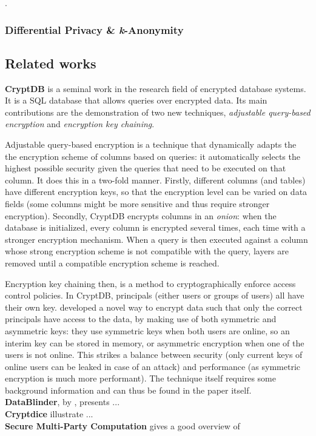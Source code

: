 .\\


\subsubsection{Differential Privacy \& \textit{k}-Anonymity}

\subsection{Related works}
\textbf{CryptDB} \citep{cryptdb} is a seminal work in the research field of encrypted database systems. It is a SQL database that allows queries over encrypted data. Its main contributions are the demonstration of two new techniques, \textit{adjustable query-based encryption} and \textit{encryption key chaining}. 

Adjustable query-based encryption is a technique that dynamically adapts the the encryption scheme of columns based on queries: it automatically selects the highest possible security given the queries that need to be executed on that column. It does this in a two-fold manner. Firstly, different columns (and tables) have different encryption keys, so that the encryption level can be varied on data fields (some columns might be more sensitive and thus require stronger encryption). Secondly, CryptDB encrypts columns in an \textit{onion}: when the database is initialized, every column is encrypted several times, each time with a stronger encryption mechanism. When a query is then executed against a column whose strong encryption scheme is not compatible with the query, layers are removed until a compatible encryption scheme is reached. 

Encryption key chaining then, is a method to cryptographically enforce access control policies. In CryptDB, principals (either users or groups of users) all have their own key. \citeauthor{cryptdb} developed a novel way to encrypt data such that only the correct principals have access to the data, by making use of both symmetric and asymmetric keys: they use symmetric keys when both users are online, so an interim key can be stored in memory, or asymmetric encryption when one of the users is not online. This strikes a balance between security (only current keys of online users can be leaked in case of an attack) and performance (as symmetric encryption is much more performant). The technique itself requires some background information and can thus be found in the paper itself.\\

\noindent \textbf{DataBlinder}, by \citet{datablinder}, presents ... \\

\noindent \textbf{Cryptdice} \citep{cryptdice} illustrate ...\\

\noindent \textbf{Secure Multi-Party Computation} \citep{secure-mpc} gives a good overview of\\


